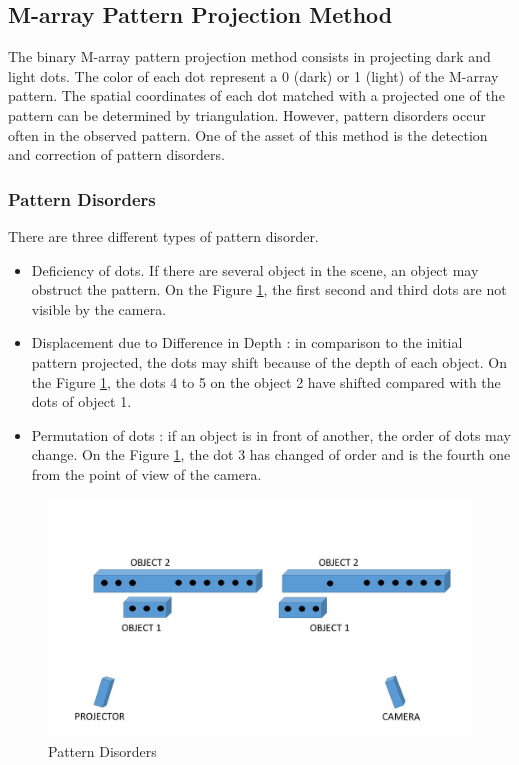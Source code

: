 \subsection{M-array Pattern Projection Method \cite{morita1988reconstruction}}

The binary M-array pattern projection method consists in projecting dark and light dots. The color of each dot represent a 0 (dark) or 1 (light) of the M-array pattern. The spatial coordinates of each dot matched with a projected one of the pattern can be determined by triangulation. However, pattern disorders occur often in the observed pattern. One of the asset of this method is the detection and correction of pattern disorders.

\subsubsection{Pattern Disorders}

There are three different types of pattern disorder.
\begin{itemize}
\item Deficiency of dots. If there are several object in the scene, an object may obstruct the pattern. On the Figure \ref{fig:disorder1}, the first second and third dots are not visible by the camera.
\item Displacement due to Difference in Depth : in comparison to the initial pattern projected, the dots may shift because of the depth of each object. On the Figure \ref{fig:disorder1}, the dots 4 to 5 on the object 2 have shifted compared with the dots of object 1.
\item Permutation of dots : if an object is in front of another, the order of dots may change. On the Figure \ref{fig:disorder1}, the dot 3 has changed of order and is the fourth one from the point of view of the camera.
\end{itemize}

\begin{figure}[h]
  \centerline{\includegraphics[scale=0.6]{fig/disorder1.jpg}}
  \caption{Pattern Disorders}
  \label{fig:disorder1}
\end{figure}






